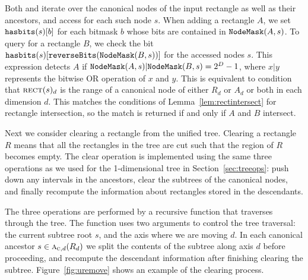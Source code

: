 \documentclass[english,gradu]{tktltiki2018}
\begin{document}
Both \adddt and \checkdt iterate over the canonical nodes of the input rectangle as well as their ancestors, and access  for each such node $s$.
When adding a rectangle $A$, we set $\hasbits{s}{b}$ for each bitmask $b$ whose bits are contained in $\maskof{A,s}$.
To query for a rectangle $B$, we check the bit $\hasbits{s}{\texttt{reverseBits}(\maskof{B,s})}$ for the accessed nodes $s$.
This expression detects $A$ if $\maskof{A,s}|\maskof{B,s}=2^D-1$, where $x|y$ represents the bitwise OR operation of $x$ and $y$.
This is equivalent to condition that $\rect{s}_d$ is the range of a canonical node of either $R_d$ or $A_d$ or both in each dimension $d$.
This matches the conditions of Lemma~\ref{lem:rectintersect} for rectangle intersection, so the match is returned if and only if $A$ and $B$ intersect.

Next we consider clearing a rectangle from the unified tree.
Clearing a rectangle $R$ means that all the rectangles in the tree are cut such that the region of $R$ becomes empty.
The clear operation is implemented using the same three operations as we used for the 1-dimensional tree in Section~\ref{sec:treeops}:
push down any intervals in the ancestors, clear the subtrees of the canonical nodes, and finally recompute the information about rectangles stored in the descendants.

The three operations are performed by a recursive function \cleardt that traverses through the tree.
The function uses two arguments to control the tree traversal: the current subtree root $s$, and the axis where we are moving $d$.
In each canonical ancestor $s\in\canonpari{R_d}{d}$ we split the contents of the subtree along axis $d$ before proceeding, and recompute the descendant information after finishing clearing the subtree.
Figure~\ref{fig:uremove} shows an example of the clearing process.
\end{document}
